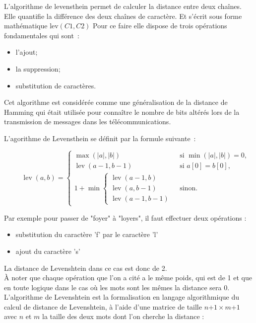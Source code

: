\documentclass[final, 10pt]{report}
\begin{document}
    L'algorithme de levensthein permet de calculer la distance entre deux chaînes.
    Elle quantifie la différence des deux chaînes de caractère. Et s'écrit sous forme mathématique $\text{lev}(C1,C2)$
    Pour ce faire elle dispose de trois opérations fondamentales qui sont~:
    \begin{itemize}
        \item l'ajout;
        \item la suppression;
        \item substitution de caractères.
    \end{itemize}
    
    \medskip
    Cet algorithme est considérée comme une généralisation de la distance de Hamming\cite{noauthor_distance_2021-1} qui était utilisée pour connaître le nombre de bits altérés lors de la transmission de messages dans les télécommunications.
    
    L'agorithme de Levensthein se définit par la formule suivante~:
    
    $$
    {\displaystyle \qquad \operatorname {lev} (a,b)={\begin{cases}\max(|a|,|b|)&{\text{ si }}\min(|a|,|b|)=0,\\\operatorname {lev} (a-1,b-1)&{\text{ si }}a[0]=b[0],\\1+\min {\begin{cases}\operatorname {lev} (a-1,b)\\\operatorname {lev} (a,b-1)\\\operatorname {lev} (a-1,b-1)\end{cases}}&{\text{ sinon.}}\end{cases}}}
     $$



Par exemple pour passer de "foyer" à "loyers", il faut effectuer deux opérations :
\begin{itemize}
    \item substitution du caractère 'f' par le caractère 'l'
    \item ajout du caractère 's'
\end{itemize}
La distance de Levenshtein dans ce cas est donc de 2.\\

À noter que chaque opération que l'on a cité a le même poids, qui est de 1 et que en toute logique dans le cas où les mots sont les mêmes la distance sera 0.\\

L'algorithme de Levenshtein est la formalisation en langage algorithmique du calcul de distance de Levenshtein,  à l'aide d'une matrice de taille $n$+$1\times m$+$1$ avec $n$ et $m$ la taille des deux mots dont l'on cherche la distance :\\
\end{document}
